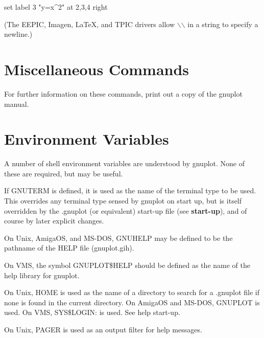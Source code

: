 {set label 3 "y=x^2" at 2,3,4 right}

(The EEPIC, Imagen, LaTeX, and TPIC drivers allow $\backslash$$\backslash$
in a string to specify a newline.)

\section{Miscellaneous Commands}

For further information on these commands, print out a copy
of the gnuplot manual.


\section{Environment Variables}

A number of shell environment variables are understood by gnuplot.
None of these are required, but may be useful.

If GNUTERM is defined, it is used as the name of the terminal type to
be used. This overrides any terminal type sensed by gnuplot on start
up, but is itself overridden by the .gnuplot (or equivalent) start-up
file (see {\bf start-up}), and of course by later explicit changes.

On Unix, AmigaOS, and MS-DOS, GNUHELP may be defined to be the pathname
of the HELP file (gnuplot.gih).

On VMS, the symbol GNUPLOT\$HELP should be defined as the name of
the help library for gnuplot.

On Unix, HOME is used as the name of a directory to search for
a .gnuplot file if none is found in the current directory.
On AmigaOS and MS-DOS, GNUPLOT is used. On VMS, SYS\$LOGIN: is used.
See help start-up.

On Unix, PAGER is used as an output filter for help messages.

